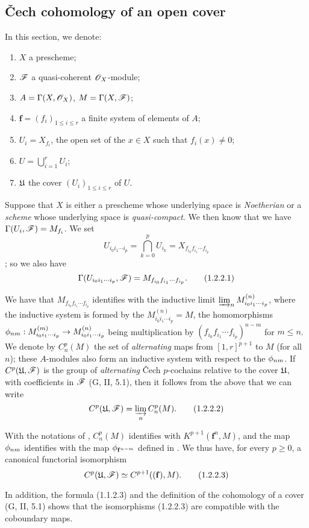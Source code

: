 \subsection{\v Cech cohomology of an open cover}
\label{subsection:3.1.2}

\begin{nota}[1.2.1]
\label{3.1.2.1}
In this section, we denote:
\begin{enumerate}[label=--]
  \item $X$ a prescheme;
  \item $\mathscr{F}$ a quasi-coherent $\mathscr{O}_X$-module;
  \item $A=\Gamma(X,\mathscr{O}_X)$, $M=\Gamma(X,\mathscr{F})$;
  \item $\mathbf{f}=(f_i)_{1\leq i\leq r}$ a finite system of elements of $A$;
  \item $U_i=X_{f_i}$, the open set  of the $x\in X$ such that $f_i(x)\neq 0$;
  \item $U=\bigcup_{i=1}^r U_i$;
  \item $\mathfrak{U}$ the cover $(U_i)_{1\leq i\leq r}$ of $U$.
\end{enumerate}
\end{nota}

\begin{env}[1.2.2]
\label{3.1.2.2}
Suppose that $X$ is either a prescheme whose underlying space is \emph{Noetherian} or a \emph{scheme} whose underlying space is \emph{quasi-compact}.
We then know  that we have $\Gamma(U_i,\mathscr{F})=M_{f_i}$.
We set
\[
  U_{i_0 i_1\cdots i_p}=\bigcap_{k=0}^p U_{i_k}=X_{f_{i_0}f_{i_1}\cdots f_{i_p}}
\]
; so we also have
\[
  \Gamma(U_{i_0 i_1\cdots i_p},\mathscr{F})=M_{f_{i_0}f_{i_1}\cdots f_{i_p}}.
  \tag{1.2.2.1}
\]

We have  that $M_{f_{i_0}f_{i_1}\cdots f_{i_p}}$ identifies with the inductive limit $\varinjlim_n M_{i_0 i_1\cdots i_p}^{(n)}$, where the inductive system is formed by the $M_{i_0 i_1\cdots i_p}^{(n)}=M$, the homomorphisms $\vphi_{nm}:M_{i_0 i_1\cdots i_p}^{(m)}\to M_{i_0 i_1\cdots i_p}^{(n)}$ being multiplication by $(f_{i_0}f_{i_1}\cdots f_{i_p})^{n-m}$ for $m\leq n$.
We denote by $C_n^p(M)$ the set of \emph{alternating} maps from $[1,r]^{p+1}$ to $M$ (for all $n$); these $A$-modules also form an inductive system with respect to the $\phi_{nm}$.
If $C^p(\mathfrak{U},\mathscr{F})$ is the group of \emph{alternating} \v Cech $p$-cochains relative to the cover $\mathfrak{U}$, with coefficients in $\mathscr{F}$ (G, II, 5.1), then it follows from the above that we can write
\[
  C^p(\mathfrak{U},\mathscr{F})=\varinjlim_n C_n^p(M).
  \tag{1.2.2.2}
\]

With the notations of , $C_n^p(M)$ identifies with $K^{p+1}(\mathbf{f}^n,M)$, and the map $\phi_{nm}$ identifies with the map $\phi_{\mathbf{f}^{n-m}}$ defined in .
We thus have, for every $p\geq 0$, a canonical functorial isomorphism
\[
  C^p(\mathfrak{U},\mathscr{F})\simeq C^{p+1}((\mathbf{f}),M).
  \tag{1.2.2.3}
\]

In addition, the formula (1.1.2.3) and the definition of the cohomology of a cover (G, II, 5.1) shows that the isomorphisms (1.2.2.3) are compatible with the coboundary maps.
\end{env}

